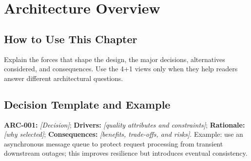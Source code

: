 \chapter{Architecture Overview}
\section{How to Use This Chapter}
Explain the forces that shape the design, the major decisions, alternatives considered, and consequences. Use the 4+1 views only when they help readers answer different architectural questions.
\section{Decision Template and Example}
\textbf{ARC-001:} \textit{[Decision]}; \textbf{Drivers:} \textit{[quality attributes and constraints]}; \textbf{Rationale:} \textit{[why selected]}; \textbf{Consequences:} \textit{[benefits, trade-offs, and risks]}. Example: use an asynchronous message queue to protect request processing from transient downstream outages; this improves resilience but introduces eventual consistency.
